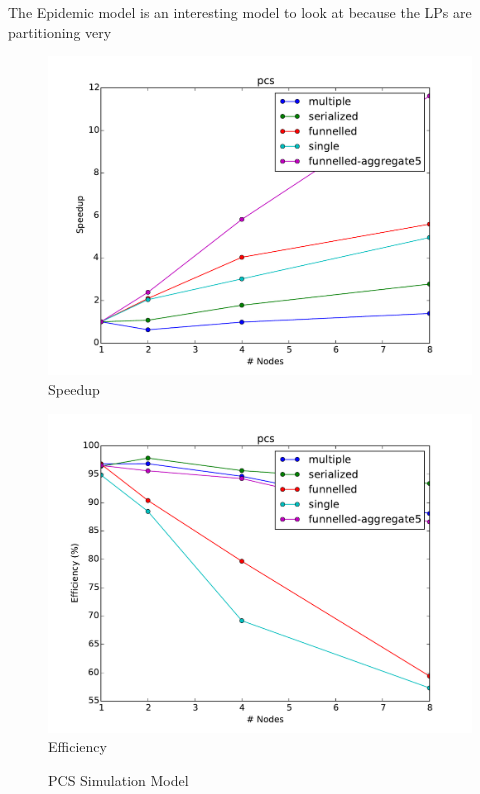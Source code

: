 \documentclass[11pt]{book}
\begin{document}
The Epidemic model is an interesting model to look at because the LPs are partitioning very

\begin{figure}
  \begin{minipage}{.5\textwidth}
    \begin{center}
      \includegraphics[width=\textwidth,keepaspectratio,quiet]{figs/partitioning_communication/communication_pcs_speedup.pdf} \\
      Speedup \\
    \end{center}
  \end{minipage}%
  \hfill
  \begin{minipage}{.5\textwidth}
    \begin{center}
      \includegraphics[width=\textwidth,keepaspectratio,quiet]{figs/partitioning_communication/communication_pcs_efficiency.pdf} \\
      Efficiency
    \end{center}
  \end{minipage}
  \caption{PCS Simulation Model}\label{pcs_communication}
\end{figure}
\end{document}
